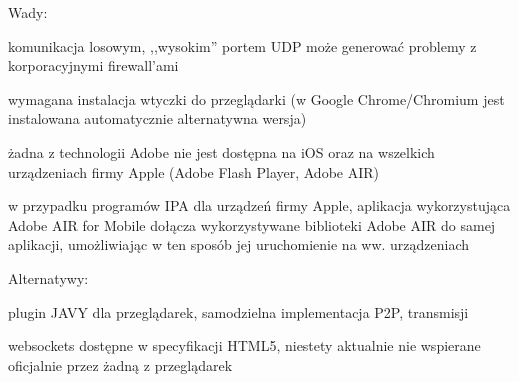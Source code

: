 \begin{minipage}{\textwidth}
    Wady:
    \begin{packed_item}
        \item{komunikacja losowym, ,,wysokim'' portem UDP może generować problemy z korporacyjnymi firewall'ami}
        \item{wymagana instalacja wtyczki do przeglądarki (w Google Chrome/Chromium jest instalowana automatycznie alternatywna wersja)}
        \item{żadna z technologii Adobe nie jest dostępna na iOS oraz na wszelkich urządzeniach firmy Apple (Adobe Flash Player, Adobe AIR)}
        \item{w przypadku programów IPA dla urządzeń firmy Apple, aplikacja wykorzystująca Adobe AIR for Mobile dołącza wykorzystywane biblioteki Adobe AIR do samej aplikacji, umożliwiając w ten sposób jej uruchomienie na ww. urządzeniach}
    \end{packed_item}

    Alternatywy:
    \begin{packed_item}
        \item{plugin JAVY dla przeglądarek, samodzielna implementacja P2P, transmisji}
        \item{websockets dostępne w specyfikacji HTML5, niestety aktualnie nie wspierane oficjalnie przez żadną z przeglądarek}
    \end{packed_item}
\end{minipage}

